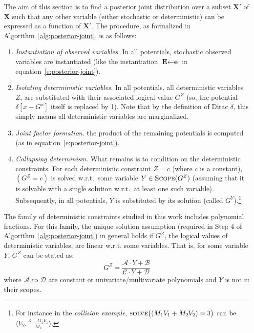\documentclass[letterpaper]{article}
\newcommand{\tuple}[1] {\langle #1 \rangle}
\newcommand{\bvec}[1]{\textbf{#1}}
\begin{document}
The aim of this section is to find a posterior joint distribution over a subset $\bvec{X}'$ of $\bvec{X}$
such that any other variable (either stochastic or deterministic)
can be expressed as a function of $\bvec{X}'$.
The procedure, as formalized in Algorithm~\ref{alg:posterior-joint}, is as follows: 
\begin{enumerate}
\item \emph{Instantiation of observed variables.} In all potentials, stochastic observed variables are instantiated
(like the instantiation $\bvec{E} \leftarrow \bvec{e}$ in equation~\ref{e:posterior-joint}).
%
\item \emph{Isolating deterministic variables.} In all potentials, all deterministic variables $Z$, are 
substituted with their associated logical value $G^Z$ (so, the potential $\delta[x - G^x]$ itself is replaced by 1). Note that by the definition of Dirac $\delta$, this simply means all deterministic variables are marginalized.
%
\item \emph{Joint factor formation.} the product of the remaining potentials is computed (as in equation~\ref{e:posterior-joint}).   
%
\item \emph{Collapsing determinism.} 
What remains is to condition on the deterministic constraints.
For each deterministic constraint $Z = c$ (where $c$ is a constant),
$(G^Z = c)$ is solved w.r.t.\ some variable $Y \in \textsc{Scope}(G^Z)$ (assuming that it is solvable with a single solution w.r.t.\ at least one such variable).
Subsequently, in all potentials, $Y$ is substituted by its solution (called $G^Y$).\footnote{For instance in the \emph{collision example}, 
$\textsc{solve}\big((M_1 V_1 + M_2 V_2)=3 \big)$ can be $\tuple{V_2, \frac{3 - M_1 V_1}{M_2}}$.} 
%
\end{enumerate}

The family of deterministic constraints studied in this work includes polynomial fractions.
For this family, 
the unique solution assumption (required in Step 4 of Algorithm~\ref{alg:posterior-joint})
in general holds if $G^Z$, the logical values of deterministic variables, are linear w.r.t. some variables.
That is, for some variable $Y$, $G^Z$ can be stated as: 
{\footnotesize
\begin{equation}
\label{eq:evidence-form}
G^Z = \frac{\mathcal{A} \cdot Y + \mathcal{B}}{\mathcal{C} \cdot Y + \mathcal{D}}
\end{equation}
}
where $\mathcal{A}$ to $\mathcal{D}$ are constant or univariate/multivariate polynomials and $Y$ is not in their scopes.
\end{document}
